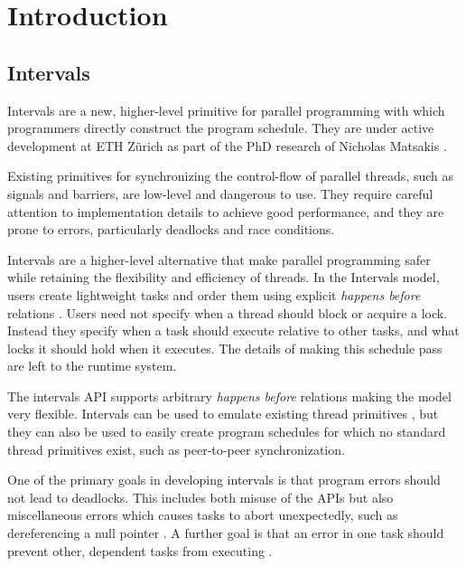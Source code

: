 
\chapter{Introduction}
\label{chap:introduction}

\section{Intervals}
\label{sec:intro-intervals}

Intervals \cite{Matsakis2009b} are a new, higher-level primitive for
parallel programming with which programmers directly construct the
program schedule. They are under active development at ETH Zürich as
part of the PhD research of Nicholas Matsakis \cite{Matsakis2010}.

Existing primitives for synchronizing the control-flow of parallel
threads, such as signals and barriers, are low-level and dangerous to
use. They require careful attention to implementation details to
achieve good performance, and they are prone to errors, particularly
deadlocks and race conditions.

Intervals are a higher-level alternative that make parallel
programming safer while retaining the flexibility and efficiency of
threads. In the Intervals model, users create lightweight tasks and
order them using explicit \emph{happens before} relations
\cite{Lamport1978}. Users need not specify when a thread should block
or acquire a lock. Instead they specify when a task should execute
relative to other tasks, and what locks it should hold when it
executes. The details of making this schedule pass are left to the
runtime system.

The intervals API supports arbitrary \emph{happens before} relations
making the model very flexible. Intervals can be used to emulate
existing thread primitives \cite{Matsakis2009b}, but they can also be
used to easily create program schedules for which no standard thread
primitives exist, such as peer-to-peer synchronization.

One of the primary goals in developing intervals is that program
errors should not lead to deadlocks. This includes both misuse of the
APIs but also miscellaneous errors which causes tasks to abort
unexpectedly, such as dereferencing a null pointer
\cite{Matsakis2009}. A further goal is that an error in one task
should prevent other, dependent tasks from executing
\cite{Matsakis2010a}.

